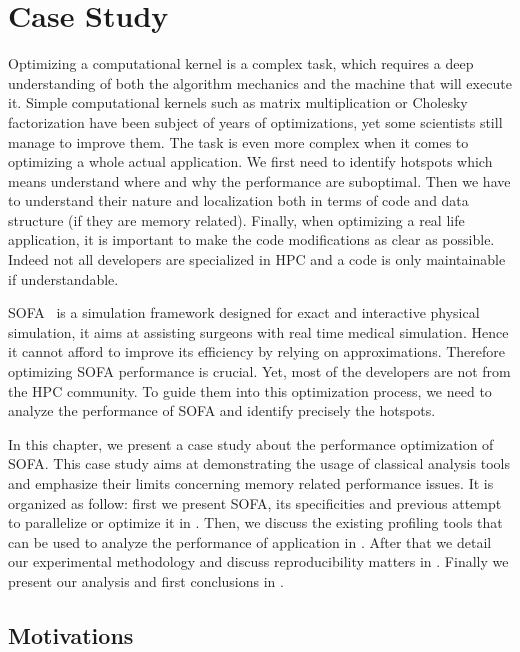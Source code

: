 \chapter{Case Study}
\label{chap:perf}

Optimizing a computational kernel is a complex task, which requires a deep understanding of both the algorithm mechanics and the machine that will execute it.
Simple computational kernels such as matrix multiplication or Cholesky factorization have been subject of years of optimizations, yet some scientists still manage to improve them.
The task is even more complex when it comes to optimizing a whole actual application.
We first need to identify hotspots which means understand where and why the performance are suboptimal.
Then we have to understand their nature and localization both in terms of code and data structure (if they are memory related).
Finally, when optimizing a real life application, it is important to make the code modifications as clear as possible.
Indeed not all developers are specialized in \gls{HPC} and a code is only maintainable if understandable.

\gls{SOFA}~\cite{Allard07SOFA} is a simulation framework designed for exact and interactive physical simulation, it aims at assisting surgeons with real time medical simulation.
Hence  it cannot afford to improve its efficiency by relying on approximations.
Therefore optimizing \gls{SOFA} performance is crucial.
Yet, most of the developers are not from the \gls{HPC} community.
To guide them into this optimization process, we need to analyze the  performance of \gls{SOFA} and identify precisely the hotspots.

In this chapter, we present a case study about the performance optimization of \gls{SOFA}.
This case study aims at demonstrating the usage of classical analysis tools and emphasize their limits concerning memory related performance issues.
It is organized as follow: first we present \gls{SOFA}, its specificities and previous attempt to parallelize or optimize it in .
Then, we discuss the existing profiling tools that can be used to analyze the performance of application in .
After that we detail our experimental methodology and discuss reproducibility matters in .
Finally we present our analysis and first conclusions in .

\section{Motivations}
\label{sec:motivations}

